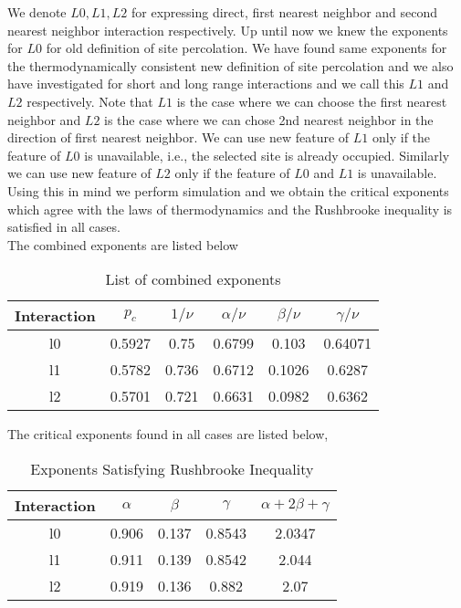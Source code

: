 We denote $L0,L1,L2$ for expressing direct, first nearest neighbor and second nearest neighbor interaction respectively. Up until now we knew the exponents for $L0$ for old definition of site percolation. We have found same exponents for the thermodynamically consistent new definition of site percolation and we also have investigated for short and long range interactions and we call this $L1$ and $L2$ respectively. Note that $L1$ is the case where we can choose the first nearest neighbor and $L2$ is the case where we can chose 2nd nearest neighbor in the direction of first nearest neighbor. We can use new feature of $L1$ only if the feature of $L0$ is unavailable, i.e., the selected site is already occupied. Similarly we can use new feature of $L2$ only if the feature of $L0$ and $L1$ is unavailable. Using this in mind we perform simulation and we obtain the critical exponents which agree with the laws of thermodynamics and the Rushbrooke inequality is satisfied in all cases.\\
The combined exponents are listed below\\
\begin{table}
\centering
\begin{tabular}{|c|c|c|c|c|c|}
	\hline
	Interaction & $p_c$ & $1/\nu$ & $\alpha/\nu$ & $\beta/\nu$ & $\gamma/\nu$ \\ \hline
	l0 & 0.5927 & 0.75  & 0.6799 & 0.103  & 0.64071  \\ \hline
	l1 & 0.5782 & 0.736 & 0.6712 & 0.1026 & 0.6287  \\ \hline
	l2 & 0.5701 & 0.721 & 0.6631 & 0.0982 & 0.6362  \\ \hline
\end{tabular}
\caption{List of combined exponents}
\label{tab:exponents-combined}
\end{table}
The critical exponents found in all cases are listed below,\\
\begin{table}
\centering
\begin{tabular}{|c|c|c|c|c|}
	\hline
	Interaction & $\alpha$ & $\beta$ & $\gamma$ & $\alpha+2\beta+\gamma$ \\ \hline
	l0  & 0.906 & 0.137 & 0.8543 & 2.0347   \\ \hline
	l1  & 0.911 & 0.139 & 0.8542 & 2.044   \\ \hline
	l2  & 0.919 & 0.136 & 0.882  & 2.07    \\ \hline
\end{tabular}
\caption{Exponents Satisfying Rushbrooke Inequality}
\label{tab:rushbrooke}
\end{table}

